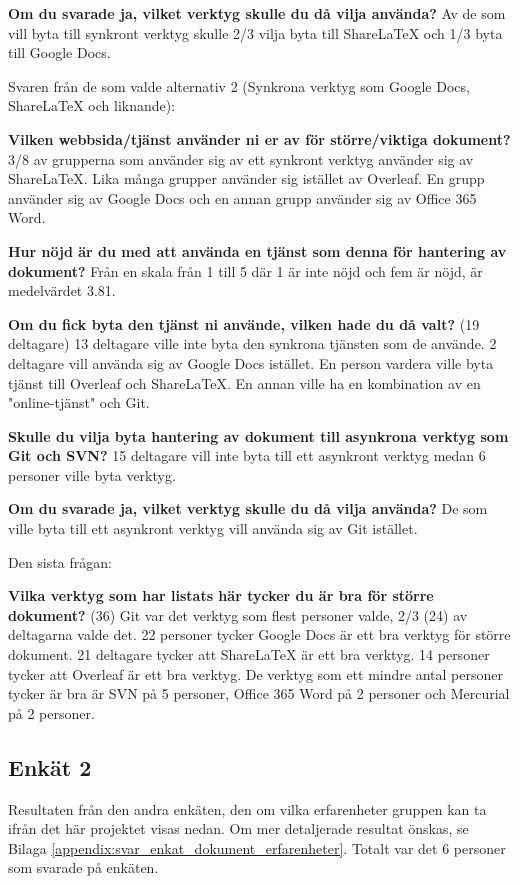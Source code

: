 \textbf{Om du svarade ja, vilket verktyg skulle du då vilja använda?}
Av de som vill byta till synkront verktyg skulle 2/3 vilja byta till ShareLaTeX och 1/3 byta till Google Docs.


Svaren från de som valde alternativ 2 (Synkrona verktyg som Google Docs, ShareLaTeX och liknande):

\textbf{Vilken webbsida/tjänst använder ni er av för större/viktiga dokument?}
3/8 av grupperna som använder sig av ett synkront verktyg använder sig av ShareLaTeX. Lika många grupper använder sig istället av Overleaf. En grupp använder sig av Google Docs och en annan grupp använder sig av Office 365 Word. 


\textbf{Hur nöjd är du med att använda en tjänst som denna för hantering av dokument?}
Från en skala från 1 till 5 där 1 är inte nöjd och fem är nöjd, är medelvärdet 3.81.

\textbf{Om du fick byta den tjänst ni använde, vilken hade du då valt?} (19 deltagare)
13 deltagare ville inte byta den synkrona tjänsten som de använde. 2 deltagare vill använda sig av Google Docs istället. En person vardera ville byta tjänst till Overleaf och ShareLaTeX. En annan ville ha en kombination av en "online-tjänst" och Git.

\textbf{Skulle du vilja byta hantering av dokument till asynkrona verktyg som Git och SVN?}
15 deltagare vill inte byta till ett asynkront verktyg medan 6 personer ville byta verktyg.

\textbf{Om du svarade ja, vilket verktyg skulle du då vilja använda?}
De som ville byta till ett asynkront verktyg vill använda sig av Git istället.

Den sista frågan:

\textbf{Vilka verktyg som har listats här tycker du är bra för större dokument?} (36)
Git var det verktyg som flest personer valde, 2/3 (24) av deltagarna valde det. 22 personer tycker Google Docs är ett bra verktyg för större dokument. 21 deltagare tycker att ShareLaTeX är ett bra verktyg. 14 personer tycker att Overleaf är ett bra verktyg. De verktyg som ett mindre antal personer tycker är bra är SVN på 5 personer, Office 365 Word på 2 personer och Mercurial på 2 personer.

\subsection{Enkät 2}
Resultaten från den andra enkäten, den om vilka erfarenheter gruppen kan ta ifrån det här projektet visas nedan. Om mer detaljerade resultat önskas, se Bilaga \ref{appendix:svar_enkat_dokument_erfarenheter}. Totalt var det 6 personer som svarade på enkäten.

